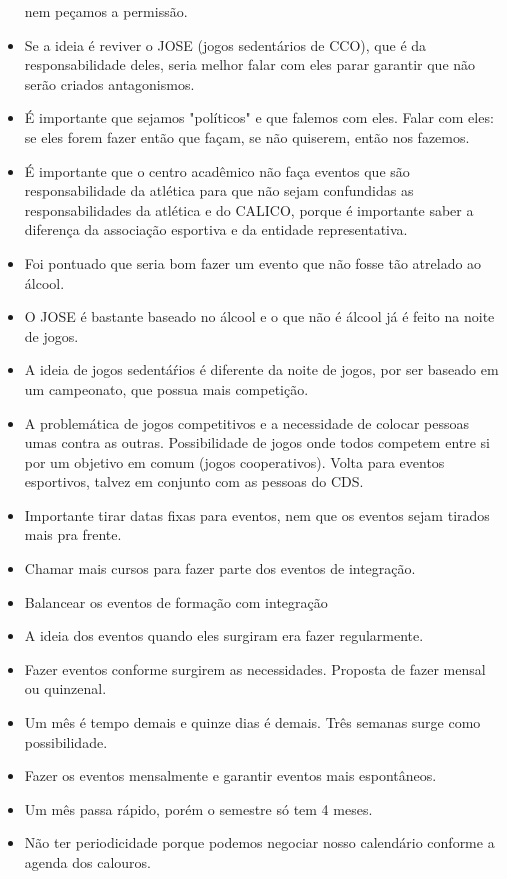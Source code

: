 \documentclass{ata-calico}
\begin{document}
\begin{itemize}
  nem peçamos a permissão.
\item Se a ideia é reviver o JOSE (jogos sedentários de CCO), que é da
  responsabilidade deles, seria melhor falar com eles parar garantir que não
  serão criados antagonismos.
\item É importante que sejamos "políticos" e que falemos com eles. Falar com eles:
  se eles forem fazer então que façam, se não quiserem, então nos fazemos.
\item É importante que o centro acadêmico não faça eventos que são responsabilidade da atlética
  para que não sejam confundidas as responsabilidades da atlética e do CALICO, porque
  é importante saber a diferença da associação esportiva e da entidade
  representativa.
\item Foi pontuado que seria bom fazer um evento que não fosse tão atrelado ao
  álcool.
\item O JOSE é bastante baseado no álcool e o que não é álcool já é feito na noite
  de jogos.
\item A ideia de jogos sedentáŕios é diferente da noite de jogos, por ser baseado
  em um campeonato, que possua mais competição.
\item A problemática de jogos competitivos e a necessidade de colocar pessoas umas
  contra as outras. Possibilidade de jogos onde todos competem entre si por um objetivo em comum
  (jogos cooperativos). Volta para eventos esportivos, talvez em conjunto com as pessoas do CDS.
\item Importante tirar datas fixas para eventos, nem que os eventos sejam tirados
  mais pra frente.
\item Chamar mais cursos para fazer parte dos eventos de integração.
\item Balancear os eventos de formação com integração
\item A ideia dos eventos quando eles surgiram era fazer regularmente.
\item Fazer eventos conforme surgirem as necessidades. Proposta de fazer mensal ou quinzenal.
\item Um mês é tempo demais e quinze dias é demais. Três semanas surge como
  possibilidade.
\item Fazer os eventos mensalmente e garantir eventos mais espontâneos.
\item Um mês passa rápido, porém o semestre só tem 4 meses.
\item Não ter periodicidade porque podemos negociar nosso calendário conforme a agenda dos calouros.
\end{itemize}
\end{document}
